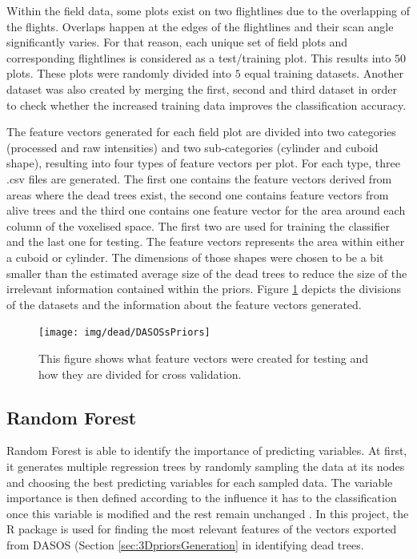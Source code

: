 \documentclass{subfiles}
\begin{document}
\par Within the field data, some plots exist on two flightlines due to the overlapping of the flights. Overlaps happen at the edges of the flightlines and their scan angle significantly varies. For that reason,  each unique set of field plots and corresponding flightlines is considered as a test/training plot. This results into $50$ plots. These plots were randomly divided into $5$ equal training datasets. Another dataset was also created by merging the first, second and third dataset in order to check whether the increased training data improves the classification accuracy.

\par The feature vectors generated for each field plot are divided into two categories (processed and raw intensities) and two sub-categories (cylinder and cuboid shape), resulting into four types of feature vectors per plot. For each type, three .csv files are generated. The first one contains the feature vectors derived from areas where the dead trees exist, the second one contains feature vectors from alive trees and the third one contains one feature vector for the area around each column of the voxelised space. The first two are used for training the classifier and the last one for testing. The feature vectors represents the area within either a cuboid or cylinder. The dimensions of those shapes were chosen to be a bit smaller than the estimated average size of the dead trees to reduce the size of the irrelevant information contained within the priors. Figure \ref{fig:DASOSsPriors} depicts the divisions of the datasets and the information about the feature vectors generated. 


\begin{figure} [h!]
	\centering
	\texttt{[image: img/dead/DASOSsPriors]}
	\caption{This figure shows what feature vectors were created for testing and how they are divided for cross validation.}
	\label{fig:DASOSsPriors}
\end{figure}


	

	
\subsection{Random Forest}\label{sec:RandomForest}
	
	
	\par Random Forest is able to identify the importance of predicting variables. At first, it generates multiple regression trees by randomly sampling the data at its nodes and choosing the best predicting variables for each sampled data. The variable importance is then defined according to the influence it has to the classification once this variable is modified and the rest remain unchanged \cite{Liaw2002}. In this project, the R package is used for finding the most relevant features of the vectors exported from DASOS (Section \ref{sec:3DpriorsGeneration} in identifying dead trees. 
\end{document}
